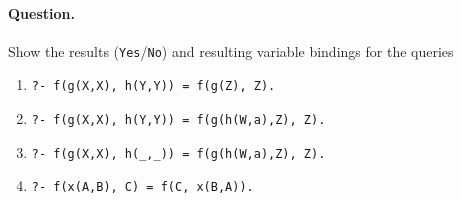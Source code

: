 \paragraph{Question.} Show the results (\texttt{Yes}/\texttt{No}) and
resulting variable bindings for the queries
\begin{enumerate}
   \item \verb|?- f(g(X,X), h(Y,Y)) = f(g(Z), Z).|
   \item \verb|?- f(g(X,X), h(Y,Y)) = f(g(h(W,a),Z), Z).|
   \item \verb|?- f(g(X,X), h(_,_)) = f(g(h(W,a),Z), Z).|
   \item \verb|?- f(x(A,B), C) = f(C, x(B,A)).|
\end{enumerate}
